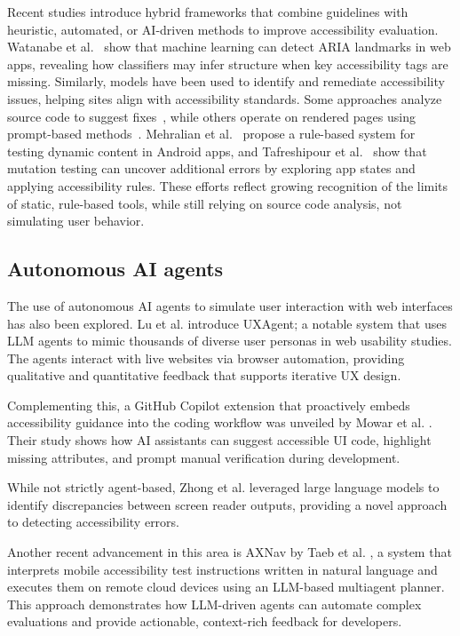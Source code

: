 Recent studies introduce hybrid frameworks that combine guidelines with heuristic, automated, or AI-driven methods to improve accessibility evaluation. Watanabe et al.~\cite{watanabe2024accessibility} show that machine learning can detect ARIA landmarks in web apps, revealing how classifiers may infer structure when key accessibility tags are missing. Similarly, models have been used to identify and remediate accessibility issues, helping sites align with accessibility standards. Some approaches analyze source code to suggest fixes~\cite{ramineni2024leveraging, kuszczynski2023comparative}, while others operate on rendered pages using prompt-based methods~\cite{he2025enhancing}. Mehralian et al.~\cite{mehralian2025automated} propose a rule-based system for testing dynamic content in Android apps, and Tafreshipour et al.~\cite{tafreshipour2024ma11y} show that mutation testing can uncover additional errors by exploring app states and applying accessibility rules. These efforts reflect growing recognition of the limits of static, rule-based tools, while still relying on source code analysis, not simulating user behavior.


\subsection{Autonomous AI agents}

The use of autonomous \ac{AI} agents to simulate user interaction with web interfaces has also been explored. Lu et al. \cite{lu2025uxagent} introduce UXAgent; a notable system that uses LLM agents to mimic thousands of diverse user personas in web usability studies. The agents interact with live websites via browser automation, providing qualitative and quantitative feedback that supports iterative UX design. 

Complementing this, a GitHub Copilot extension that proactively embeds accessibility guidance into the coding workflow was unveiled by Mowar et al. \cite{mowar2025codea11y}. Their study shows how \ac{AI} assistants can suggest accessible \ac{UI} code, highlight missing attributes, and prompt manual verification during development.

While not strictly agent-based, Zhong et al. \cite{zhong2025screenaudit} leveraged large language models to identify discrepancies between screen reader outputs, providing a novel approach to detecting accessibility errors.

Another recent advancement in this area is AXNav by Taeb et al. \cite{taeb2024axnav}, a system that interprets mobile accessibility test instructions written in natural language and executes them on remote cloud devices using an LLM-based multiagent planner. This approach demonstrates how LLM-driven agents can automate complex evaluations and provide actionable, context-rich feedback for developers.

